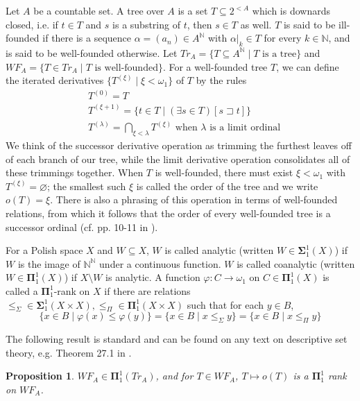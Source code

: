 \documentclass{article}
\newtheorem{proposition}[theorem]{Proposition}
\newcommand{\N}{\mathbb N}
\begin{document}
Let $A$ be a countable set. A tree over $A$ is a set $T\subseteq 2^{<A}$ which is downards closed, i.e. if $t\in T$ and $s$ is a substring of $t$, then $s\in T$ as well. $T$ is said to be ill-founded if there is a sequence $\alpha = (a_n)\in A^\N$ with $\alpha|_k\in T$ for every $k\in\N$, and is said to be well-founded otherwise. Let $Tr_A = \{T\subseteq A^{\N}\mid T\text{ is a tree}\}$ and $WF_A = \{T\in Tr_A\mid T\text{ is well-founded}\}$. For a well-founded tree $T$, we can define the iterated derivatives $\{T^{(\xi)}\mid \xi<\omega_1\}$  of $T$ by the rules
\begin{align*}
&T^{(0)} = T\\
&T^{(\xi+1)} = \{t\in T\mid (\exists s\in T)[s\sqsupset t]\}\\
&T^{(\lambda)} = \bigcap_{\xi < \lambda} T^{(\xi)} \text{ when $\lambda$ is a limit ordinal}
\end{align*}
We think of the successor derivative operation as trimming the furthest leaves off of each branch of our tree, while the limit derivative operation consolidates all of these trimmings together. When $T$ is well-founded, there must exist $\xi < \omega_1$ with $T^{(\xi)} = \varnothing$; the smallest such $\xi$ is called the order of the tree and we write $o(T) = \xi$. There is also a phrasing of this operation in terms of well-founded relations, from which it follows that the order of every well-founded tree is a successor ordinal (cf. pp. 10-11 in \cite{K}).

For a Polish space $X$ and $W\subseteq X$, $W$ is called analytic (written $W\in\boldsymbol\Sigma_1^1(X)$) if $W$ is the image of $\N^\N$ under a continuous function. $W$ is called coanalytic (written $W\in\boldsymbol\Pi_1^1(X)$) if $X\setminus W$ is analytic. A function $\varphi:C\rightarrow\omega_1$ on $C\in\boldsymbol\Pi_1^1(X)$ is called a $\boldsymbol\Pi_1^1$-rank on $X$ if there are relations $\leq_\Sigma\in \boldsymbol\Sigma_1^1(X\times X), \leq_\Pi\in\boldsymbol\Pi_1^1(X\times X)$ such that for each $y\in B$,
\begin{equation*}
\{x\in B\mid \varphi(x)\leq\varphi(y)\} = \{x\in B\mid x\leq_\Sigma y\} = \{x\in B\mid x\leq_\Pi y\}
\end{equation*}

The following result is standard and can be found on any text on descriptive set theory, e.g. Theorem 27.1 in \cite{K}.

\begin{proposition}
$WF_A\in\boldsymbol\Pi_1^1(Tr_A)$, and for $T\in WF_A$, $T\mapsto o(T)$ is a $\boldsymbol\Pi_1^1$ rank on $WF_A$.
\end{proposition}
\end{document}
